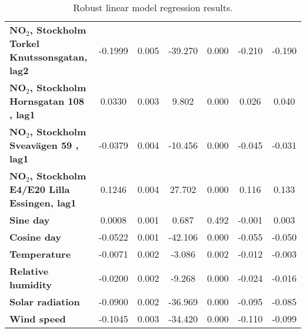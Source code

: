 \begin{landscape}
\begin{table}
\begin{center}
\begin{tabular}{lcccccc}
\textbf{NO$_2$, Stockholm Torkel Knutssonsgatan, lag2} &      -0.1999  &        0.005     &   -39.270  &         0.000        &       -0.210    &       -0.190     \\
\textbf{NO$_2$, Stockholm Hornsgatan 108 , lag1}       &       0.0330  &        0.003     &     9.802  &         0.000        &        0.026    &        0.040     \\
\textbf{NO$_2$, Stockholm Sveavägen 59 , lag1}         &      -0.0379  &        0.004     &   -10.456  &         0.000        &       -0.045    &       -0.031     \\
\textbf{NO$_2$, Stockholm E4/E20 Lilla Essingen, lag1} &       0.1246  &        0.004     &    27.702  &         0.000        &        0.116    &        0.133     \\
\textbf{Sine day}                                         &       0.0008  &        0.001     &     0.687  &         0.492        &       -0.001    &        0.003     \\
\textbf{Cosine day}                                       &      -0.0522  &        0.001     &   -42.106  &         0.000        &       -0.055    &       -0.050     \\
\textbf{Temperature}                                      &      -0.0071  &        0.002     &    -3.086  &         0.002        &       -0.012    &       -0.003     \\
\textbf{Relative humidity}                                &      -0.0200  &        0.002     &    -9.268  &         0.000        &       -0.024    &       -0.016     \\
\textbf{Solar radiation}                                  &      -0.0900  &        0.002     &   -36.969  &         0.000        &       -0.095    &       -0.085     \\
\textbf{Wind speed}                                       &      -0.1045  &        0.003     &   -34.420  &         0.000        &       -0.110    &       -0.099     \\
\bottomrule
\end{tabular}
\caption{Robust linear model regression results.}
\label{tab:Robust_table}
\end{center}
\end{table}
\end{landscape}
